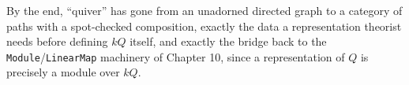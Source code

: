 By the end, ``quiver'' has gone from an unadorned directed graph to a category of paths with a spot-checked composition, exactly the data a representation theorist needs before defining \(kQ\) itself, and exactly the bridge back to the \texttt{Module}/\texttt{LinearMap} machinery of Chapter 10, since a representation of \(Q\) is precisely a module over \(kQ\).










